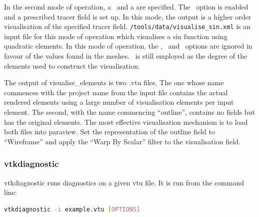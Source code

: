 In the second mode of operation, a \ and a
 are specified. The \ option is
enabled and a prescribed tracer field is set up. In this mode, the output is
a higher order visualisation of the specified tracer
field. \fluiditysourcepath\lstinline[language=Bash]+/tools/data/visualise_sin.xml+
is an input file for this mode of operation which visualises a sin function
using quadratic elements. In this mode of operation, the
, \ and
\ options are ignored in favour of the values
found in the meshes. \ is still
employed as the degree of the elements used to construct the visualisation.

The output of visualise\_elements is two .vtu files. The one whose name
commences with the project name from the input file contains the actual
rendered elements using a large number of visualisation elements per input
element. The second, with the name commencing ``outline'', contains no
fields but has the original elements. The most effective visualisation
mechanism is to load both files into paraview. Set the representation of the
outline field to ``Wireframe'' and apply the ``Warp By Scalar'' filter to
the visualisation field.


\subsubsection{vtkdiagnostic}
\label{sec:vtkdiagnostic}
vtkdiagnostic runs diagnostics on a given vtu file. It is run from the command line:
\begin{lstlisting}[language = Bash]
vtkdiagnostic -i example.vtu [OPTIONS]
\end{lstlisting}

